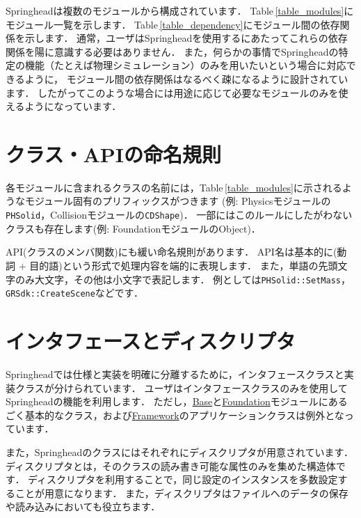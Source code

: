 Springhead\KLUDGE は複数のモジュールから構成されています．
Table\,\ref{table_modules}\KLUDGE にモジュール一覧を示します．
Table\,\ref{table_dependency}\KLUDGE にモジュール間の依存関係を示します．
\KLUDGE 通常，ユーザはSpringhead\KLUDGE を使用するにあたってこれらの依存関係を陽に意識する必要はありません．
\KLUDGE また，何らかの事情でSpringhead\KLUDGE の特定の機能（たとえば物理シミュレーション）のみを用いたいという場合に対応できるように，
\KLUDGE モジュール間の依存関係はなるべく疎になるように設計されています．
\KLUDGE したがってこのような場合には用途に応じて必要なモジュールのみを使えるようになっています．

\section{\KLUDGE クラス・API\KLUDGE の命名規則}

\KLUDGE 各モジュールに含まれるクラスの名前には，Table\,\ref{table_modules}\KLUDGE に示されるようなモジュール固有のプリフィックスがつきます
(\KLUDGE 例: Physics\KLUDGE モジュールの\texttt{PHSolid}\KLUDGE ，Collision\KLUDGE モジュールの\texttt{CDShape})\KLUDGE ．
\KLUDGE 一部にはこのルールにしたがわないクラスも存在します(\KLUDGE 例: Foundation\KLUDGE モジュールのObject)\KLUDGE ．

API(\KLUDGE クラスのメンバ関数)\KLUDGE にも緩い命名規則があります．
API\KLUDGE 名は基本的に(\KLUDGE 動詞 + \KLUDGE 目的語)\KLUDGE という形式で処理内容を端的に表現します．
\KLUDGE また，単語の先頭文字のみ大文字，その他は小文字で表記します．
\KLUDGE 例としては\texttt{PHSolid::SetMass}\KLUDGE ，\texttt{GRSdk::CreateScene}\KLUDGE などです．

\section{\KLUDGE インタフェースとディスクリプタ} 
\label{sec_if_desc}

Springhead\KLUDGE では仕様と実装を明確に分離するために，インタフェースクラスと実装クラスが分けられています．
\KLUDGE ユーザはインタフェースクラスのみを使用してSpringhead\KLUDGE の機能を利用します．
\KLUDGE ただし，\url{Base}\KLUDGE と\url{Foundation}\KLUDGE モジュールにあるごく基本的なクラス，および\url{Framework}\KLUDGE のアプリケーションクラスは例外となっています．

\KLUDGE また，Springhead\KLUDGE のクラスにはそれぞれにディスクリプタが用意されています．ディスクリプタとは，そのクラスの読み書き可能な属性のみを集めた構造体です．
\KLUDGE ディスクリプタを利用することで，同じ設定のインスタンスを多数設定することが用意になります．
\KLUDGE また，ディスクリプタはファイルへのデータの保存や読み込みにおいても役立ちます．

